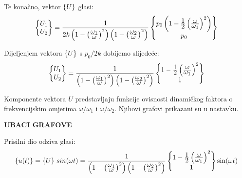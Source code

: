 Te konačno, vektor $\vtor{U}{}$ glasi:
\begin{equation}\label{eq:vektor_u_konacno}
    \begin{Bmatrix}
        U_1\\
        U_2
    \end{Bmatrix}
    =
    \frac{1}{2k\left(1-\left(\frac{\displaystyle \omega_1}{\displaystyle \omega}\right)^2\right)\left(1-\left(\frac{\displaystyle \omega_2}{\displaystyle \omega}\right)^2\right)}
    \begin{Bmatrix}
        p_0\left(1-\frac{\displaystyle 1}{\displaystyle 2}\left(\frac{\displaystyle \omega}{\displaystyle \omega_1}\right)^2\right)\\
        p_0 
    \end{Bmatrix}
\end{equation}

Dijeljenjem vektora $\vtor{U}{}$ s $p_0/2k$ dobijemo slijedeće:
\begin{equation}
    \begin{Bmatrix}
        U_1\\
        U_2
    \end{Bmatrix}
    =
    \frac{1}{\left(1-\left(\frac{\displaystyle \omega_1}{\displaystyle \omega}\right)^2\right)\left(1-\left(\frac{\displaystyle \omega_2}{\displaystyle \omega}\right)^2\right)}
    \begin{Bmatrix}
        1-\frac{\displaystyle 1}{\displaystyle 2}\left(\frac{\displaystyle \omega}{\displaystyle \omega_1}\right)^2\\
        1 
    \end{Bmatrix}
\end{equation}


Komponente vektora $U$ predstavljaju funkcije ovisnosti dinamičkog faktora o 
frekvencijskim omjerima $\omega/\omega_1$ i $\omega/\omega_2$. Njihovi grafovi
prikazani su u nastavku.

\textbf{UBACI GRAFOVE}

Prisilni dio odziva glasi:
\begin{equation}
    \begin{split}
        \vtor{u(t)}{} = \vtor{U}{}\; sin(\omega t)
        =
        \frac{1}{\left(1-\left(\ffrac{\omega_1}{\omega}\right)^2\right)\left(1-\left(\ffrac{\omega_2}{\omega}\right)^2\right)}
    \begin{Bmatrix}
        1-\ffrac{1}{2}\left(\ffrac{\omega}{\omega_1}\right)^2\\
        1 
    \end{Bmatrix}
    \sin(\omega t)
    \end{split}
\end{equation}

